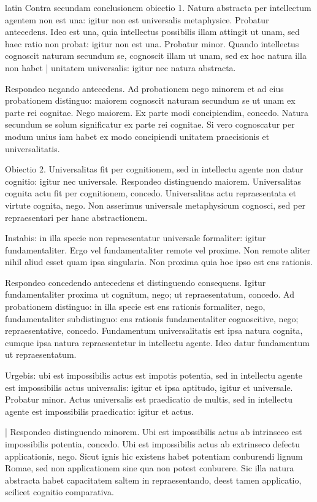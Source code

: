 \begin{otherlanguage*}{latin}
\pstart
  Contra secundam conclusionem obiectio 1. Natura abstracta per intellectum agentem non est una: igitur non est universalis metaphysice. Probatur antecedens. Ideo est una, quia intellectus possibilis illam attingit ut unam, sed haec ratio non probat: igitur non est una. Probatur minor. Quando intellectus cognoscit naturam secundum se, cognoscit illam ut unam, sed ex hoc natura illa non habet \textnormal{|} unitatem universalis: igitur nec natura abstracta. 
\pend

\pstart
  Respondeo negando antecedens. Ad probationem nego minorem et ad eius probationem distinguo: maiorem cognoscit naturam secundum se ut unam ex parte rei cognitae. Nego maiorem. Ex parte modi concipiendim, concedo. Natura secundum se solum significatur ex parte rei cognitae. Si vero cognoscatur per modum unius iam habet ex modo concipiendi unitatem praecisionis et universalitatis. 
\pend

\pstart
  Obiectio 2. Universalitas fit per cognitionem, sed in intellectu agente non datur cognitio: igitur nec universale. Respondeo distinguendo maiorem. Universalitas cognita actu fit per cognitionem, concedo. Universalitas actu repraesentata et virtute cognita, nego. Non asserimus universale metaphysicum cognosci, sed per repraesentari per hanc abstractionem. 
\pend

\pstart
  Instabis: in illa specie non repraesentatur universale formaliter: igitur fundamentaliter. Ergo vel fundamentaliter remote vel proxime. Non remote aliter nihil aliud esset quam ipsa singularia. Non proxima quia hoc ipso est ens rationis. 
\pend

\pstart
  Respondeo concedendo antecedens et distinguendo consequens. Igitur fundamentaliter proxima ut cognitum, nego; ut repraesentatum, concedo. Ad probationem distinguo: in illa specie est ens rationis formaliter, nego, fundamentaliter subdistinguo: ens rationis fundamentaliter cognoscitive, nego; repraesentative, concedo. Fundamentum universalitatis est ipsa natura cognita, cumque ipsa natura repraesentetur in intellectu agente. Ideo datur fundamentum ut repraesentatum. 
\pend

\pstart
  Urgebis: ubi est impossibilis actus est impotis potentia, sed in intellectu agente est impossibilis actus universalis: igitur et ipsa aptitudo, igitur et universale. Probatur minor. Actus universalis est praedicatio de multis, sed in intellectu agente est impossibilis praedicatio: igitur et actus. 
\pend

\pstart
  \textnormal{|}   Respondeo distinguendo minorem. Ubi est impossibilis actus  ab intrinseco est impossibilis potentia, concedo. Ubi est impossibilis actus ab extrinseco defectu applicationis, nego. Sicut ignis hic existens habet potentiam conburendi lignum Romae, sed non applicationem sine qua non potest conburere. Sic illa natura abstracta habet capacitatem saltem in repraesentando, deest tamen applicatio, scilicet cognitio comparativa. 
\pend


\end{otherlanguage*}
